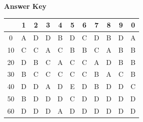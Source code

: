 \documentclass[11pt,a4paper]{article}
\begin{document}
\textbf{Answer Key}
\begin{tabular}{ | c | c c c c c c c c c c | }
\hline
 & 1 & 2 & 3 & 4 & 5 & 6 & 7 & 8 & 9 & 0 \\
\hline
0 & A & D & D & B & D & C & D & B & D & A \\
10 & C & C & A & C & B & B & C & A & B & B \\
20 & D & B & C & A & C & C & A & D & B & B \\
30 & B & C & C & C & C & C & B & A & C & B \\
40 & D & D & A & D & E & D & B & D & D & C \\
50 & B & D & D & D & C & D & D & D & D & D \\
60 & D & D & D & A & D & D & D & D & D & D \\
\hline
\end{tabular}
\clearpage
\end{document}
